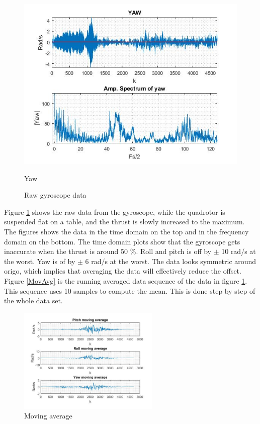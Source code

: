\begin{figure}[H]
\begin{minipage}[b]{0.32\textwidth}
                \includegraphics[width =\textwidth, angle =0]{NoisePictures/YAW1.jpg}
                \caption{Yaw}
            \end{minipage}
\label{fig:rawData}
\caption{Raw gyroscope data}
\end{figure}
Figure \ref{fig:rawData} shows the raw data from the gyroscope, while the quadrotor is suspended flat on a table, and the thrust is slowly increased to the maximum. The figures shows the data in the time domain on the top and in the frequency domain on the bottom. The time domain plots show that the gyroscope gets inaccurate when the thrust is around 50 \%. Roll and pitch is off by $\pm$ 10 rad/s at the worst. Yaw is of by $\pm$ 6 rad/s at the worst. The data looks symmetric around origo, which implies that averaging the data will effectively reduce the offset. Figure \ref{MovAvg} is the running averaged data sequence of the data in figure \ref{fig:rawData}. This sequence uses 10 samples to compute the mean. This is done step by step of the whole data set.
\begin{figure}[H]
    \centering
         \includegraphics[width = 0.6\textwidth]{NoisePictures/MovingAverageFigure.jpg}
      \caption{Moving average}
    \label{fig:MovAvg}
\end{figure} 
